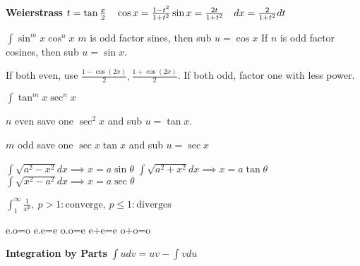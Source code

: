 \documentclass[10pt,a4paper,landscape]{article}
\begin{document}
\begin{multicols*}{5}
	\textbf{Weierstrass} \newline
	$ t = \tan{ \frac{x}{2} } \quad \cos{ x } = \frac{ 1-t^2 }{ 1+t^2 }\newline \sin{ x } = \frac{2t}{1+t^2} \quad dx = \frac{2}{1+t^2}dt  $\newline

$\int \sin^m{ x } \cos^n{ x } $\newline
 $ m $ is odd factor sines, then sub $ u= \cos{ x }  $
If $ n $ is odd factor cosines, then sub $ u= \sin{ x }  $. 

If both even, use $ \frac{ 1- \cos{ (2x) }  }{ 2 }, \frac{ 1+ \cos(2x) }{ 2 }  $.
If both odd, factor one with less power.\newline

$\int \tan^mx \sec^nx$

$n$ even save one $ \sec^2x $ and sub $ u = \tan{ x }  $. 

$m$ odd save one $ \sec x \tan{ x } $ and sub $ u = \sec x $ \newline

$\int \sqrt{ a^2-x^2 } dx \implies x = a \sin{ \theta }$
$\int \sqrt{ a^2+x^2 } dx \implies x = a \tan{ \theta }$
$\int \sqrt{ x^2-a^2 } dx \implies x = a \sec{\theta}$ 

$ \int^{\infty}_{1} \frac{1}{x^p} ,\ p>1 : \text{converge, } p 	\leq 1 : \text{diverges} $

e.o=o \quad e.e=e \quad o.o=e \quad e+e=e \quad o+o=o

\textbf{Integration by Parts}\newline
	$ \int u dv = uv-\int v du $


\end{multicols*}
\end{document}
